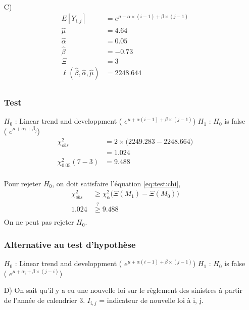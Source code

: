 \begin{itemize}
\item[C)]
\begin{align*}
E[Y_{i,j}] &= e^{\mu + \alpha\times(i-1) + \beta \times (j-1)} \\
\widehat{\mu} &= 4.64 \\
\widehat{\alpha} &= 0.05 \\
\widehat{\beta} &= -0.73 \\
\Xi &= 3 \\
\ell(\widehat{\beta}, \widehat{\alpha}, \widehat{\mu}) & = 2248.644 \\
\end{align*} 
\subsubsection*{Test}
$H_0$ : Linear trend and developpment ( $e^{\mu + \alpha(i-1) + \beta \times (j-1)}$) \newline
$H_1$ : $H_0$ is false ( $e^{\mu + \alpha_i + \beta_j}$)
\begin{align*}
\chi_{obs}^2 &= 2 \times \Big( 2249.283 - 2248.664 \Big) \\
&= 1.024 \\
\chi_{0.05}^2(7 - 3) &= 9.488 \\
\end{align*}

Pour rejeter $H_0$, on doit satisfaire l'équation \ref{eq:test:chi},
\begin{align*}
\chi_{obs}^2 &\geq \chi_{\alpha}^2\Big( \Xi (M_1) - \Xi (M_0) \Big) \\
1.024 &\overset{?}{\geq} 9.488\\
\end{align*}
On ne peut pas rejeter $H_0$.
\bigskip

\subsubsection*{Alternative au test d'hypothèse}
$H_0$ : Linear trend and developpment ( $e^{\mu + \alpha(i-1) + \beta \times (j-1)}$) \newline
$H_1$ : $H_0$ is false ( $e^{\mu + \alpha_i + \beta \times (j-i)}$)

\bigskip
\item[D)]
On sait qu'il y a eu une nouvelle loi sur le règlement des sinistres à partir de l'année de calendrier 3. $I_{i,j}$ = indicateur de nouvelle loi à i, j.


\end{itemize}
